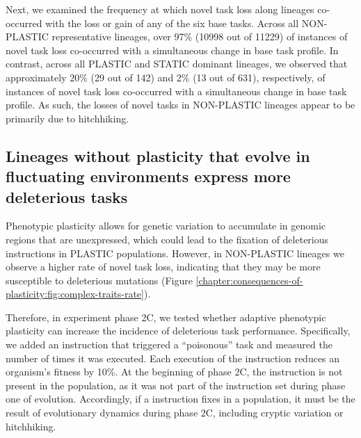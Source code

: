 Next, we examined the frequency at which novel task loss along lineages co-occurred with the loss or gain of any of the six base tasks.
Across all NON-PLASTIC representative lineages, over 97\% (10998 out of 11229) of instances of novel task loss co-occurred with a simultaneous change in base task profile.
In contrast, across all PLASTIC and STATIC dominant lineages, we observed that approximately 20\% (29 out of 142) and 2\% (13 out of 631), respectively, of instances of novel task loss co-occurred with a simultaneous change in base task profile.
As such, the losses of novel tasks in NON-PLASTIC lineages appear to be primarily due to hitchhiking.

\subsection{Lineages without plasticity that evolve in fluctuating environments express more deleterious tasks}


Phenotypic plasticity allows for genetic variation to accumulate in genomic regions that are unexpressed, which could lead to the fixation of deleterious instructions in PLASTIC populations.
However, in NON-PLASTIC lineages we observe a higher rate of novel task loss, indicating that they may be more susceptible to deleterious mutations (Figure \ref{chapter:consequences-of-plasticity:fig:complex-traits-rate}).

Therefore, in experiment phase 2C, we tested whether adaptive phenotypic plasticity can increase the incidence of deleterious task performance. 
Specifically, we added an instruction that triggered a ``poisonous'' task and measured the number of times it was executed.
Each execution of the   instruction reduces an organism's fitness by 10\%. 
At the beginning of phase 2C, the  instruction is not present in the population, as it was not part of the instruction set during phase one of evolution.
Accordingly, if a  instruction fixes in a population, it must be the result of evolutionary dynamics during phase 2C, including cryptic variation or hitchhiking. 

